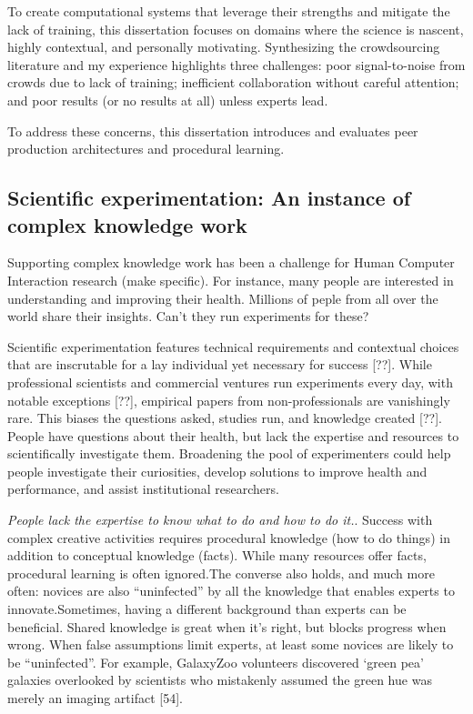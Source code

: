To create computational systems that leverage their strengths and mitigate the lack of training, this dissertation 
focuses on domains where the science is nascent, highly contextual, and personally motivating.
 Synthesizing the crowdsourcing literature and my experience highlights three challenges: 
poor signal-to-noise from crowds due to lack of training; inefficient collaboration without 
careful attention; and poor results (or no results at all) unless experts lead. 

To address  these concerns,  this dissertation introduces and evaluates peer production architectures 
and procedural learning.

\subsection{Scientific experimentation: An instance of complex knowledge work}
Supporting complex knowledge work has been a challenge for Human Computer Interaction
 research (make specific). For instance, many people are interested in understanding and 
improving their health. Millions of peple from all over the world share their insights. 
Can't they run experiments for these?

Scientific experimentation features technical requirements and contextual choices 
that are inscrutable for a lay individual yet necessary for success [??]. While 
professional scientists and commercial ventures run experiments every day, with 
notable exceptions [??], empirical papers from non-professionals are 
vanishingly rare. This biases the questions asked, studies run, and knowledge 
created [??]. People have questions about their health, but lack the expertise 
and resources to scientifically investigate them. Broadening the pool of 
experimenters could help people investigate their curiosities, develop solutions 
to improve health and performance, and assist institutional researchers.


\textit{People lack the expertise to know what to do and how to do it.}. 
Success with complex creative activities requires procedural
knowledge (how to do things) in addition to conceptual
knowledge (facts). While many resources offer facts, procedural
learning is often ignored.The converse also holds, and much more often: novices are also
“uninfected” by all the knowledge that enables experts to
innovate.Sometimes, having a different background than experts can
be beneficial. Shared knowledge is great when it’s right, but
blocks progress when wrong. When false assumptions limit
experts, at least some novices are likely to be “uninfected”.
For example, GalaxyZoo volunteers discovered ‘green pea’
galaxies overlooked by scientists who mistakenly assumed
the green hue was merely an imaging artifact [54]. 



